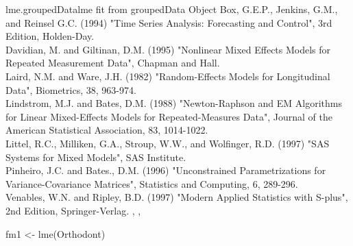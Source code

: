 \documentclass[pdftex]{article} \usepackage{url,graphicx}
\begin{document}
\begin{Helpfile}{lme.groupedData}{{\sc lme} fit from groupedData Object}
Box, G.E.P., Jenkins, G.M., and Reinsel G.C. (1994) "Time Series
Analysis: Forecasting and Control", 3rd Edition, Holden-Day. \\
Davidian, M. and Giltinan, D.M. (1995) "Nonlinear Mixed Effects Models
for Repeated Measurement Data", Chapman and Hall.\\
Laird, N.M. and Ware, J.H. (1982) "Random-Effects Models for
Longitudinal Data", Biometrics, 38, 963-974.  \\
Lindstrom, M.J. and Bates, D.M. (1988) "Newton-Raphson and EM
Algorithms for Linear Mixed-Effects Models for Repeated-Measures
Data", Journal of the American Statistical Association, 83,
1014-1022. \\
Littel, R.C., Milliken, G.A., Stroup, W.W., and Wolfinger, R.D. (1997)
"SAS Systems for Mixed Models", SAS Institute.\\
Pinheiro, J.C. and Bates., D.M.  (1996) "Unconstrained
Parametrizations for Variance-Covariance Matrices", Statistics and
Computing, 6, 289-296.\\
Venables, W.N. and Ripley, B.D. (1997) "Modern Applied Statistics with
S-plus", 2nd Edition, Springer-Verlag.
, ,
\need 15pt
\vspace{-16pt}
\begin{Example}
fm1 <- lme(Orthodont)
\end{Example}
\end{Helpfile}
\end{document}

